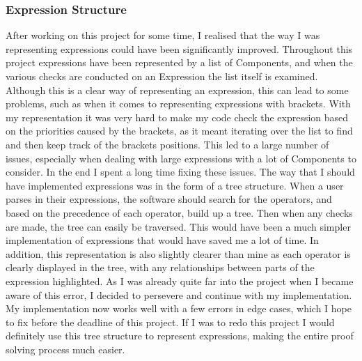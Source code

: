 \subsubsection{Expression Structure}
After working on this project for some time, I realised that the way I was representing expressions could have been significantly improved. Throughout this project expressions have been represented by a list of Components, and when the various checks are conducted on an Expression the list itself is examined. Although this is a clear way of representing an expression, this can lead to some problems, such as when it comes to representing expressions with brackets. With my representation it was very hard to make my code check the expression based on the priorities caused by the brackets, as it meant iterating over the list to find and then keep track of the brackets positions. This led to a large number of issues, especially when dealing with large expressions with a lot of Components to consider. In the end I spent a long time fixing these issues. The way that I should have implemented expressions was in the form of a tree structure. When a user parses in their expressions, the software should search for the operators, and based on the precedence of each operator, build up a tree. Then when any checks are made, the tree can easily be traversed. This would have been a much simpler implementation of expressions that would have saved me a lot of time. In addition, this representation is also slightly clearer than mine as each operator is clearly displayed in the tree, with any relationships between parts of the expression highlighted. As I was already quite far into the project when I became aware of this error, I decided to persevere and continue with my implementation. My implementation now works well with a few errors in edge cases, which I hope to fix before the deadline of this project. If I was to redo this project I would definitely use this tree structure to represent expressions, making the entire proof solving process much easier.

